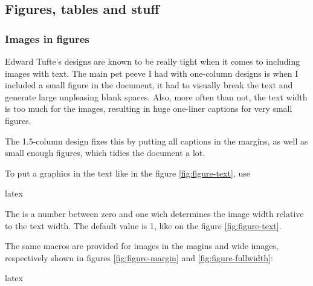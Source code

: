 \documentclass[raggedright, twoside, 11pt, colorful]{tufte-style-article}
\begin{document}
\newpage


\subsection{Figures, tables and stuff}

\subsubsection{Images in figures}
Edward Tufte's designs are known to be really tight when it comes to including images with text. The main pet peeve I had with one-column designs is when I included a small figure in the document, it had to visually break the text and generate large unpleasing blank spaces. Also, more often than not, the text width is too much for the images, resulting in huge one-liner captions for very small figures.

The 1.5-column design fixes this by putting all captions in the margins, as well as small enough figures, which tidies the document a lot.



To put a graphics in the text like in the figure \ref{fig:figure-text}, use
\begin{codebox}{latex}
\end{codebox}
The  is a number between zero and one wich determines the image width relative to the text width. The default value is 1, like on the figure \ref{fig:figure-text}.

The same macros are provided for images in the magins and wide images, respectively shown in figures \ref{fig:figure-margin} and \ref{fig:figure-fullwidth}:
\begin{codebox}{latex}
\end{codebox}
\end{document}

